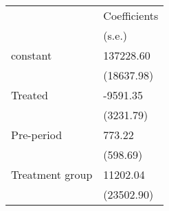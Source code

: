 \begin{tabular}{ll}
\toprule
{} & Coefficients \\
{} &       (s.e.) \\
\midrule
constant        &    137228.60 \\
                &   (18637.98) \\
Treated         &     -9591.35 \\
                &    (3231.79) \\
Pre-period      &       773.22 \\
                &     (598.69) \\
Treatment group &     11202.04 \\
                &   (23502.90) \\
\bottomrule
\end{tabular}
